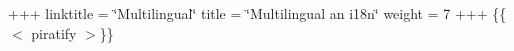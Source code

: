 +++ linktitle = \char`\"{}\+Multilingual\char`\"{} title = \char`\"{}\+Multilingual an\textquotesingle{} i18n\char`\"{} weight = 7 +++ \{\{$<$ piratify $>$\}\} 